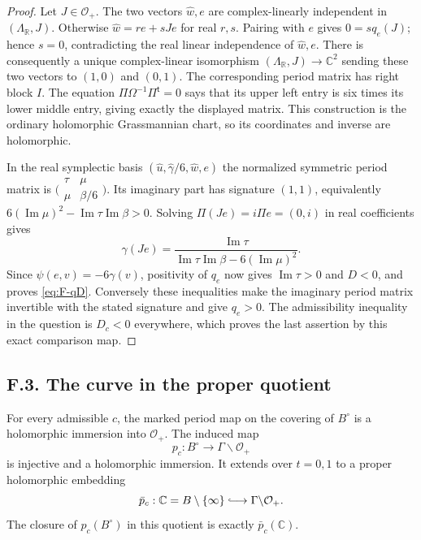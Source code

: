 \begin{proof}
Let $J\in\mathcal O_+$.  The two vectors $\widehat w,e$ are complex-linearly
independent in $(\Lambda_{\mathbb R},J)$.  Otherwise
$\widehat w=r e+sJe$ for real $r,s$.  Pairing with $e$ gives
$0=sq_e(J)$; hence $s=0$, contradicting the real linear independence
of $\widehat w,e$.  There is consequently a unique complex-linear
isomorphism $(\Lambda_{\mathbb R},J)\to\mathbb C^2$ sending these two
vectors to $(1,0)$ and $(0,1)$.  The corresponding period matrix has
right block $I$.  The equation
$\Pi\Omega^{-1}\Pi^{\mathsf t}=0$ says that its upper left entry is
six times its lower middle entry, giving exactly the displayed matrix.
This construction is the ordinary holomorphic Grassmannian chart,
so its coordinates and inverse are holomorphic.

In the real symplectic basis
$(\widehat u,\widehat\gamma/6,\widehat w,e)$ the normalized symmetric
period matrix is
$\bigl(\begin{smallmatrix}\tau&\mu\\\mu&\beta/6\end{smallmatrix}\bigr)$.
Its imaginary part has signature $(1,1)$, equivalently
$6(\operatorname{Im}\mu)^2-
\operatorname{Im}\tau\operatorname{Im}\beta>0$.
Solving $\Pi(Je)=i\Pi e=(0,i)$ in real coefficients gives
\[
 \gamma(Je)=
 \frac{\operatorname{Im}\tau}
 {\operatorname{Im}\tau\operatorname{Im}\beta-
 6(\operatorname{Im}\mu)^2}.
\]
Since $\psi(e,v)=-6\gamma(v)$, positivity of $q_e$ now gives
$\operatorname{Im}\tau>0$ and $D<0$, and proves \eqref{eq:F-qD}.
Conversely these inequalities make the imaginary period matrix
invertible with the stated signature and give $q_e>0$.  The admissibility
inequality in the question is $D_c<0$ everywhere, which proves the last
assertion by this exact comparison map.
\end{proof}

\subsection{F.3. The curve in the proper quotient}

\begin{theorem}[F.3.1; Proved]\label{st:F.3.1}
For every admissible $c$, the marked period map on the covering of
$B^\circ$ is a holomorphic immersion into $\mathcal O_+$.  The induced
map
\[
 p_c:B^\circ\longrightarrow\Gamma\backslash\mathcal O_+
\]
is injective and a holomorphic immersion.  It extends over $t=0,1$ to a
proper holomorphic embedding
\[
 \bar p_c:\mathbb C=B\setminus\{\infty\}
 \lhook\joinrel\longrightarrow\Gamma\backslash\mathcal O_+.
\]
The closure of $p_c(B^\circ)$ in this quotient is exactly
$\bar p_c(\mathbb C)$.
\end{theorem}

